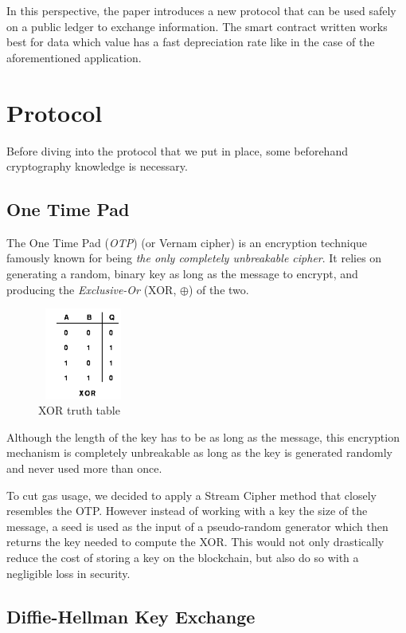 \documentclass[conference]{IEEEtran}
\begin{document}
In this perspective, the paper introduces a new protocol that can be used safely on a public ledger to exchange information. The smart contract written works best for data which value has a fast depreciation rate like in the case of the aforementioned application.


\section{Protocol}
Before diving into the protocol that we put in place, some beforehand cryptography knowledge is necessary.

\medskip
\subsection{One Time Pad}
The One Time Pad (\textit{OTP}) \cite{OTP} (or Vernam cipher) is an encryption technique famously known for being \textit{the only completely unbreakable cipher}. It relies on generating a random, binary key as long as the message to encrypt, and producing the \textit{Exclusive-Or} (XOR, $\oplus$) of the two. 

\begin{figure}[htp]
  \centering
  \includegraphics[width=3cm, height=3cm]{Xor.png}
  \caption{XOR truth table}
  \label{fig:truth-table}
\end{figure}

Although the length of the key has to be as long as the message, this encryption mechanism is completely unbreakable as long as the key is generated randomly and never used more than once.

To cut gas usage, we decided to apply a Stream Cipher method that closely resembles the OTP. However instead of working with a key the size of the message, a seed is used as the input of a pseudo-random generator which then returns the key needed to compute the XOR. This would not only drastically reduce the cost of storing a key on the blockchain, but also do so with a negligible loss in security.

\medskip
\subsection{Diffie-Hellman Key Exchange}
\end{document}
